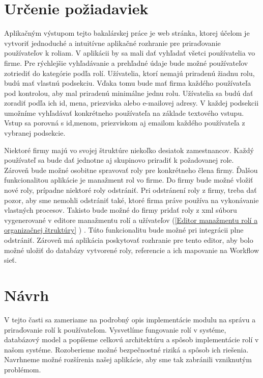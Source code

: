 

\section{Určenie požiadaviek}
Aplikačným výstupom tejto bakalárskej práce je web stránka, ktorej účelom je vytvoriť jednoduché a intuitívne aplikačné rozhranie pre priraďovanie používateľov k roliam. V aplikácii by sa mali dať vyhľadať všetci používatelia vo firme. Pre rýchlejšie vyhľadávanie a prehľadné údaje bude možné používateľov zotriediť do kategórie podľa rolí. Užívatelia, ktorí nemajú priradenú žiadnu rolu, budú mať vlastnú podsekciu. Vďaka tomu bude mať firma každého používateľa pod kontrolou, aby mal priradenú minimálne jednu rolu. Užívatelia sa budú dať zoradiť podľa ich id, mena, priezviska alebo e-mailovej adresy. V každej podsekcii umožníme vyhľadávať konkrétneho používateľa na základe textového vstupu. Vstup sa porovná s id,menom, priezviskom aj emailom každého používateľa z vybranej podsekcie. 

Niektoré firmy majú vo svojej štruktúre niekoľko desiatok zamestnancov.   Každý používateľ sa bude dať jednotne aj skupinovo priradiť k požadovanej role. Zároveň bude možné osobitne spravovať roly pre konkrétneho člena firmy. Ďalšou funkcionalitou aplikácie je manažment rol vo firme. Do firmy bude možné vložiť nové roly, prípadne niektoré roly odstrániť. Pri odstránení roly z firmy, treba dať pozor, aby sme nemohli odstrániť také, ktoré firma práve používa na vykonávanie vlastných procesov. Takisto bude možné do firmy pridať roly z xml súboru vygenerované v editore manažmentu rolí a užívateľov (\ref{Editor manažmentu rolí a organizačnej štruktúry} ) . Túto funkcionalitu bude možné pri integrácii plne odstrániť. Zároveň má aplikácia poskytovať rozhranie pre tento editor, aby bolo možné uložiť do databázy vytvorené roly, referencie a ich mapovanie na Workflow sieť.


\section{Návrh}
V tejto časti sa zameriame na podrobný opis implementácie modulu na správu a priraďovanie rolí k používateľom. Vysvetlíme fungovanie rolí v systéme, databázový model a popíšeme celkovú architektúru a spôsob implementácie rolí v našom systéme. Rozoberieme možné bezpečnostné riziká a spôsob ich riešenia. Navrhneme možné rozšírenia našej aplikácie, aby sme tak zabránili vzniknutým problémom.

